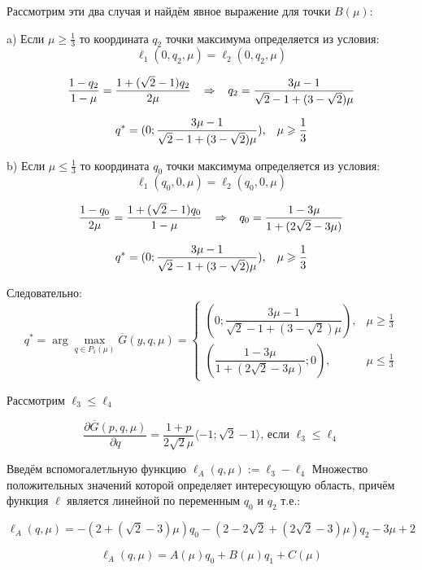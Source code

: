 \begin{flushleft}
	Рассмотрим эти два случая и найдём явное выражение для точки $B(\mu)$:
	
	a) Если $\mu \geqslant \frac{1}{3}$ то координата $q_2$ точки 
	максимума определяется из условия: 
	$$\ell_1(0,q_2,\mu)=\ell_2(0,q_2,\mu)$$

	$$
	\frac{1-q_2}{1-\mu}=\frac{1+(\sqrt{2} - 1)q_2}{2\mu} 
	\hspace{3mm} \Rightarrow \hspace{3mm}
	q_2=\frac{3\mu-1}{\sqrt{2}-1+(3-\sqrt{2})\mu}	
	$$

	$$q^*=(0;\dfrac{3\mu-1}{\sqrt{2}-1+(3-\sqrt{2})\mu}), \hspace{3mm}
	\mu \geqslant \frac{1}{3}$$

	b) Если $\mu \leqslant \frac{1}{3}$ то координата $q_0$ точки 
	максимума определяется из условия: 	
	$$\ell_1(q_0,0,\mu)=\ell_2(q_0,0,\mu)$$

	$$
	\frac{1-q_0}{2\mu}=\frac{1+(\sqrt{2} - 1)q_0}{1-\mu} 
	\hspace{3mm} \Rightarrow \hspace{3mm}
	q_0=\frac{1-3\mu}{1+(2\sqrt{2}-3\mu)}	
	$$
	
	$$q^*=(0;\dfrac{3\mu-1}{\sqrt{2}-1+(3-\sqrt{2})\mu}), \hspace{3mm}
	\mu \geqslant \frac{1}{3}$$

	Следовательно:
	$$
	q^*= \arg \max \limits_{q\in P_1(\mu)} \overline G(y,q,\mu) =
	\begin{cases}
		(0;\dfrac{3\mu-1}{\sqrt{2}-1+(3-\sqrt{2})\mu}), & \mu \geqslant \frac{1}{3} \\
		(\dfrac{1-3\mu}{1+(2\sqrt{2}-3\mu)};0), & \mu \leqslant \frac{1}{3}
	\end{cases}
	$$


	 Рассмотрим $\ell_3 \leqslant \ell_4$
	
	$$\frac{\partial \overline{G}(p,q,\mu)}{\partial q}=
	\frac{1+p}{2\sqrt{2}\mu} \langle -1;\sqrt{2}-1 \rangle 
 	\textrm{, если }\ell_3 \leqslant \ell_4$$
 	
	Введём вспомогалетльную функцию	
 	$\ell_A(q, \mu):=\ell_3-\ell_4$
 	Множество положительных значений которой определяет интересующую область,
 	причём функция $\ell$ является линейной по переменным $q_0$ и $q_2$ т.е.:
 	
	$$\ell_A(q, \mu)=
	-(2+(\sqrt{2}-3)\mu)q_0
	-(2-2\sqrt{2}+(2\sqrt{2}-3)\mu)q_2
	-3\mu+2$$ 	
 	
	$$\ell_A(q, \mu)=A(\mu)q_0+B(\mu)q_1+C(\mu)$$
	

\end{flushleft}

